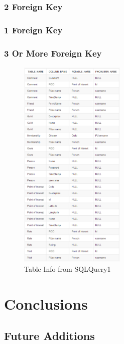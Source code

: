 \documentclass{acm_proc_article-sp}
\begin{document}
\subsubsection{2 Foreign Key}



\subsubsection{1 Foreign Key}



\subsubsection{3 Or More Foreign Key}



\begin{figure}[h!]
  \caption{Table Info from SQLQuery1}
  \centering
    \includegraphics[width=0.45\textwidth]{Images/TableInfo}
\end{figure}

\section{Conclusions}

\subsection{Future Additions}
\end{document}
